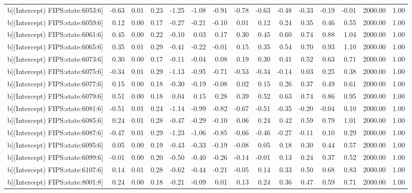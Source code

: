 \begin{table}[ht]
\begin{tabular}{rrrrrrrrrrrrrrr}
  b[(Intercept) FIPS:state:6053:6] & -0.63 & 0.01 & 0.23 & -1.25 & -1.08 & -0.91 & -0.78 & -0.63 & -0.48 & -0.33 & -0.19 & -0.01 & 2000.00 & 1.00 \\ 
  b[(Intercept) FIPS:state:6059:6] & 0.12 & 0.00 & 0.17 & -0.27 & -0.21 & -0.10 & 0.01 & 0.12 & 0.24 & 0.35 & 0.46 & 0.55 & 2000.00 & 1.00 \\ 
  b[(Intercept) FIPS:state:6061:6] & 0.45 & 0.00 & 0.22 & -0.10 & 0.03 & 0.17 & 0.30 & 0.45 & 0.60 & 0.74 & 0.88 & 1.04 & 2000.00 & 1.00 \\ 
  b[(Intercept) FIPS:state:6065:6] & 0.35 & 0.01 & 0.29 & -0.41 & -0.22 & -0.01 & 0.15 & 0.35 & 0.54 & 0.70 & 0.93 & 1.10 & 2000.00 & 1.00 \\ 
  b[(Intercept) FIPS:state:6073:6] & 0.30 & 0.00 & 0.17 & -0.11 & -0.04 & 0.08 & 0.19 & 0.30 & 0.41 & 0.52 & 0.63 & 0.71 & 2000.00 & 1.00 \\ 
  b[(Intercept) FIPS:state:6075:6] & -0.34 & 0.01 & 0.29 & -1.13 & -0.95 & -0.71 & -0.53 & -0.34 & -0.14 & 0.03 & 0.25 & 0.38 & 2000.00 & 1.00 \\ 
  b[(Intercept) FIPS:state:6077:6] & 0.15 & 0.00 & 0.18 & -0.30 & -0.19 & -0.08 & 0.02 & 0.15 & 0.26 & 0.37 & 0.49 & 0.61 & 2000.00 & 1.00 \\ 
  b[(Intercept) FIPS:state:6079:6] & 0.51 & 0.00 & 0.18 & 0.04 & 0.15 & 0.28 & 0.39 & 0.52 & 0.63 & 0.74 & 0.86 & 0.95 & 2000.00 & 1.00 \\ 
  b[(Intercept) FIPS:state:6081:6] & -0.51 & 0.01 & 0.24 & -1.14 & -0.99 & -0.82 & -0.67 & -0.51 & -0.35 & -0.20 & -0.04 & 0.10 & 2000.00 & 1.00 \\ 
  b[(Intercept) FIPS:state:6085:6] & 0.24 & 0.01 & 0.28 & -0.47 & -0.29 & -0.10 & 0.06 & 0.24 & 0.42 & 0.59 & 0.79 & 1.01 & 2000.00 & 1.00 \\ 
  b[(Intercept) FIPS:state:6087:6] & -0.47 & 0.01 & 0.29 & -1.23 & -1.06 & -0.85 & -0.66 & -0.46 & -0.27 & -0.11 & 0.10 & 0.29 & 2000.00 & 1.00 \\ 
  b[(Intercept) FIPS:state:6095:6] & 0.05 & 0.00 & 0.19 & -0.43 & -0.33 & -0.19 & -0.08 & 0.05 & 0.18 & 0.30 & 0.44 & 0.57 & 2000.00 & 1.00 \\ 
  b[(Intercept) FIPS:state:6099:6] & -0.01 & 0.00 & 0.20 & -0.50 & -0.40 & -0.26 & -0.14 & -0.01 & 0.13 & 0.24 & 0.37 & 0.52 & 2000.00 & 1.00 \\ 
  b[(Intercept) FIPS:state:6107:6] & 0.14 & 0.01 & 0.28 & -0.62 & -0.44 & -0.21 & -0.05 & 0.14 & 0.33 & 0.50 & 0.68 & 0.83 & 2000.00 & 1.00 \\ 
  b[(Intercept) FIPS:state:8001:8] & 0.24 & 0.00 & 0.18 & -0.21 & -0.09 & 0.01 & 0.13 & 0.24 & 0.36 & 0.47 & 0.59 & 0.71 & 2000.00 & 1.00 \\ 

\end{tabular}
\end{table}
